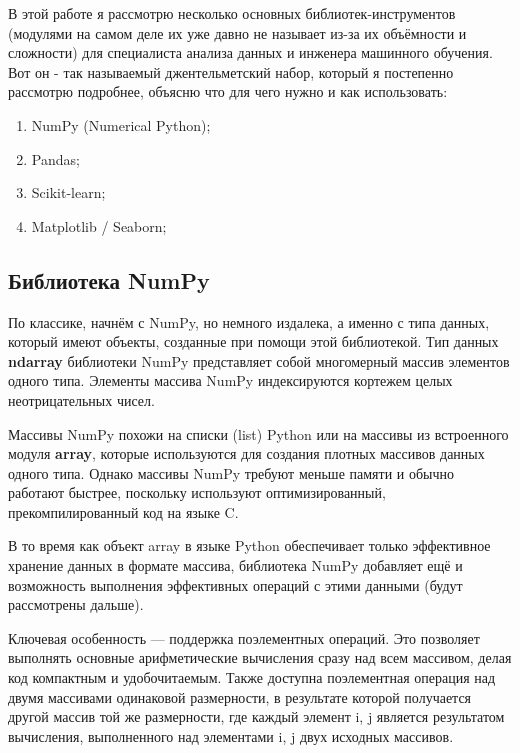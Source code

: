 \documentclass[pract]{SCWorks}
\begin{document}
В этой работе я рассмотрю несколько основных библиотек-инструментов (модулями на самом деле их уже 
давно не называет из-за их объёмности и сложности) для специалиста анализа данных и инженера машинного обучения.
Вот он - так называемый джентельметский набор, который я постепенно рассмотрю подробнее, объясню 
что для чего нужно и как использовать:

\begin{enumerate}
    \item NumPy (Numerical Python);
    \item Pandas;
    \item Scikit-learn;
    \item Matplotlib / Seaborn;
\end{enumerate}

\subsection{Библиотека NumPy}

По классике, начнём с NumPy, но немного издалека, а именно с типа данных, который имеют объекты, 
созданные при помощи этой библиотекой. Тип данных \textbf{ndarray} библиотеки NumPy представляет собой
многомерный массив элементов одного типа. Элементы массива NumPy индексируются кортежем целых 
неотрицательных чисел. 

Массивы NumPy похожи на списки (list) Python или на массивы из встроенного модуля \textbf{array}, которые 
используются для создания плотных массивов данных одного типа. Однако массивы NumPy требуют меньше 
памяти и обычно работают быстрее, поскольку используют оптимизированный, прекомпилированный код на 
языке C.

В то время как объект array в языке Python обеспечивает только эффективное хранение данных в формате 
массива, библиотека NumPy добавляет ещё и возможность выполнения эффективных операций с этими данными 
(будут рассмотрены дальше). 

Ключевая особенность — поддержка поэлементных операций. Это позволяет выполнять основные арифметические 
вычисления сразу над всем массивом, делая код компактным и удобочитаемым.
Также доступна поэлементная операция над двумя массивами одинаковой размерности, в результате 
которой получается другой массив той же размерности, где каждый элемент i, j является результатом вычисления, 
выполненного над элементами i, j двух исходных массивов.
\end{document}
